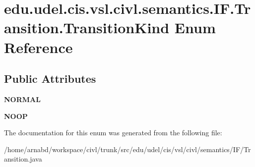 \hypertarget{enumedu_1_1udel_1_1cis_1_1vsl_1_1civl_1_1semantics_1_1IF_1_1Transition_1_1TransitionKind}{}\section{edu.\+udel.\+cis.\+vsl.\+civl.\+semantics.\+I\+F.\+Transition.\+Transition\+Kind Enum Reference}
\label{enumedu_1_1udel_1_1cis_1_1vsl_1_1civl_1_1semantics_1_1IF_1_1Transition_1_1TransitionKind}
\subsection*{Public Attributes}
\begin{DoxyCompactItemize}
\item 
\hypertarget{enumedu_1_1udel_1_1cis_1_1vsl_1_1civl_1_1semantics_1_1IF_1_1Transition_1_1TransitionKind_ad0926db769ee3a8ddceeb3b392953d2d}{}{\bfseries N\+O\+R\+M\+A\+L}\label{enumedu_1_1udel_1_1cis_1_1vsl_1_1civl_1_1semantics_1_1IF_1_1Transition_1_1TransitionKind_ad0926db769ee3a8ddceeb3b392953d2d}

\item 
\hypertarget{enumedu_1_1udel_1_1cis_1_1vsl_1_1civl_1_1semantics_1_1IF_1_1Transition_1_1TransitionKind_a2f7dbdb563b140d14f955478131ca09e}{}{\bfseries N\+O\+O\+P}\label{enumedu_1_1udel_1_1cis_1_1vsl_1_1civl_1_1semantics_1_1IF_1_1Transition_1_1TransitionKind_a2f7dbdb563b140d14f955478131ca09e}

\end{DoxyCompactItemize}


The documentation for this enum was generated from the following file\+:\begin{DoxyCompactItemize}
\item 
/home/arnabd/workspace/civl/trunk/src/edu/udel/cis/vsl/civl/semantics/\+I\+F/Transition.\+java\end{DoxyCompactItemize}
